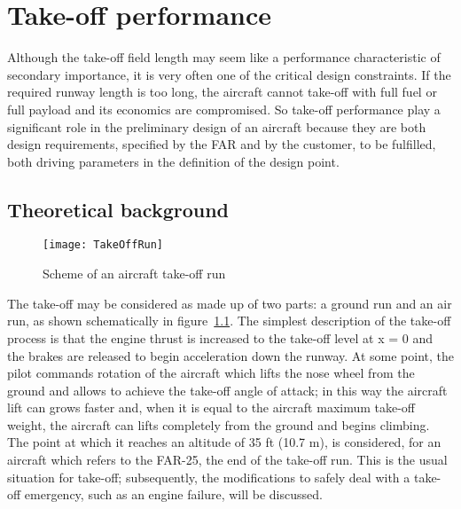 \chapter{Take-off performance}
Although the take-off field length may seem like a performance characteristic of secondary importance, it is very often one of the critical design constraints. If the required runway length is too long, the aircraft cannot take-off with full fuel or full payload and its economics are compromised.
%
So take-off performance play a significant role in the preliminary design of an aircraft because they are both design requirements, specified by the FAR and by the customer, to be fulfilled, both driving parameters in the definition of the design point. 
%
\section{Theoretical background}
%
\begin{figure}[!b]
\centering
\texttt{[image: TakeOffRun]}
\caption{Scheme of an aircraft take-off run}
\label{fig:TOrun}
\end{figure}
%
The take-off may be considered as made up of two parts: a ground run and an air run, as shown schematically in figure~\ref{fig:TOrun}. The simplest description of the take-off process is that the engine thrust is increased to the take-off level at x = 0 and the brakes are released to begin acceleration down the runway. At some point, the pilot commands rotation of the aircraft which lifts the nose wheel from the ground and allows to achieve the take-off angle of attack; in this way the aircraft lift can grows faster and, when it is equal to the aircraft maximum take-off weight, the aircraft can lifts completely from the ground and begins climbing. The point at which it reaches an altitude of 35 \si{ft} (10.7 \si{\meter}), is considered, for an aircraft which refers to the FAR-25, the end of the take-off run. 
%
This is the usual situation for take-off; subsequently, the modifications to safely deal with a take-off emergency, such as an engine failure, will be discussed.
%
